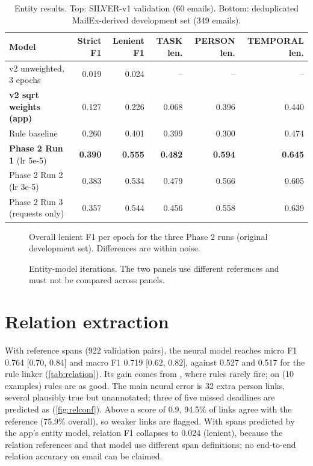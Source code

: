 \begin{table}[htbp]
\centering
\caption{Entity results. Top: SILVER-v1 validation (60 emails). Bottom: deduplicated MailEx-derived development set (349 emails).}
\label{tab:entity}
\footnotesize
\begin{tabular}{@{}lrrrrr@{}}
\toprule
Model & Strict F1 & Lenient F1 & TASK len. & PERSON len. & TEMPORAL len. \\
\midrule
v2 unweighted, 3 epochs & 0.019 & 0.024 & -- & -- & -- \\
\textbf{v2 sqrt weights (app)} & 0.127 & 0.226 & 0.068 & 0.396 & 0.440 \\
\midrule
Rule baseline & 0.260 & 0.401 & 0.399 & 0.300 & 0.474 \\
\textbf{Phase 2 Run 1} (lr 5e-5) & \textbf{0.390} & \textbf{0.555} & \textbf{0.482} & \textbf{0.594} & \textbf{0.645} \\
Phase 2 Run 2 (lr 3e-5) & 0.383 & 0.534 & 0.479 & 0.566 & 0.605 \\
Phase 2 Run 3 (requests only) & 0.357 & 0.544 & 0.456 & 0.558 & 0.639 \\
\bottomrule
\end{tabular}
\end{table}


\begin{figure}[htbp]
\centering
{}
\caption{Overall lenient F1 per epoch for the three Phase 2 runs (original development set). Differences are within noise.}
\label{fig:runs}
\end{figure}

\begin{figure}[htbp]
\centering
{}
\caption{Entity-model iterations. The two panels use different references and must not be compared across panels.}
\label{fig:iterations}
\end{figure}

\section{Relation extraction}
With reference spans (922 validation pairs), the neural model reaches micro F1 0.764 [0.70, 0.84] and macro F1 0.719 [0.62, 0.82], against 0.527 and 0.517 for the rule linker (\cref{tab:relation}). Its gain comes from , where rules rarely fire; on  (10 examples) rules are as good. The main neural error is 32 extra person links, several plausibly true but unannotated; three of five missed deadlines are predicted as  (\cref{fig:relconf}). Above a score of 0.9, 94.5\% of links agree with the reference (75.9\% overall), so weaker links are flagged. With spans predicted by the app's entity model, relation F1 collapses to 0.024 (lenient), because the relation references and that model use different span definitions; no end-to-end relation accuracy on email can be claimed.

